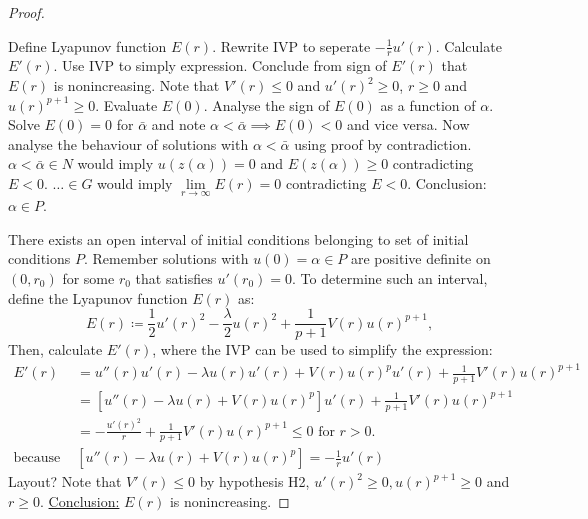 \begin{lemma}
\begin{proof}
  \begin{outline}
    \1 Define Lyapunov function $E(r)$.
    \1 Rewrite IVP to seperate $-\frac{1}{r}u'(r)$.
    \1 Calculate $E'(r)$.
    \1 Use IVP to simply expression.
    \1 Conclude from sign of $E'(r)$ that $E(r)$ is nonincreasing.
      \2 Note that $V'(r)\leq0$ and $u'(r)^2\geq0$, $r\geq0$ and $u(r)^{p+1}\geq0$.
    \1 Evaluate $E(0)$. Analyse the sign of $E(0)$ as a function of $\alpha$.
      \2 Solve $E(0)=0$ for $\bar\alpha$ and note $\alpha<\bar\alpha\implies E(0)<0$ and vice versa.
    \1 Now analyse the behaviour of solutions with $\alpha<\bar\alpha$ using proof by contradiction.
      \2 $\alpha<\bar\alpha\in N$ would imply $u(z(\alpha))=0$ and $E(z(\alpha))\geq0$ contradicting $E<0$.
      \2 $\ldots\in G$ would imply $\underset{r\to\infty}{\lim}E(r)=0$ contradicting $E<0$.
    \1 Conclusion: $\alpha\in P$.
  \end{outline}
  \seperate
There exists an open interval of initial conditions belonging to set of initial conditions $P$.
Remember solutions with $u(0)=\alpha\in P$ are positive definite on $(0,r_0)$ for some $r_0$ that satisfies $u'(r_0)=0$.
To determine such an interval, define the Lyapunov function $E(r)$ as:
$$E(r)\coloneqq\frac{1}{2}u'(r)^2-\frac{\lambda}{2}u(r)^2+\frac{1}{p+1}V(r)u(r)^{p+1},$$
Then, calculate $E'(r)$, where the IVP can be used to simplify the expression:
\begin{align*}
    E'(r)&=u''(r)u'(r)-\lambda u(r)u'(r)+V(r)u(r)^pu'(r)+\frac{1}{p+1}V'(r)u(r)^{p+1}\\
    &=\left[u''(r)-\lambda u(r)+V(r)u(r)^p\right]u'(r)+\frac{1}{p+1}V'(r)u(r)^{p+1}\\
    &=-\frac{u'(r)^2}{r}+\frac{1}{p+1}V'(r)u(r)^{p+1}\leq0\text{ for }r>0.\\
    \text{because }&\left[u''(r)-\lambda u(r)+V(r)u(r)^p\right]=-\frac{1}{r}u'(r)
\end{align*}
{\color{red}Layout?} Note that $V'(r)\leq0$ by hypothesis H2, $u'(r)^2\geq0, u(r)^{p+1}\geq0$ and $r\geq0$.
\underline{Conclusion:} $E(r)$ is nonincreasing.
\seperate


\end{proof}
\end{lemma}
